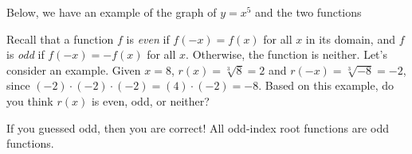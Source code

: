\documentclass{ximera}
\begin{document}
\begin{example}
Below, we have an example of the graph of $y=x^5$ and the two functions

\begin{image}
\end{image}

\end{example}

Recall that a function $f$ is {\em even} if $f(-x) = f(x)$ for all $x$ in its domain, and $f$ is {\em odd} if $f(-x) = -f(x)$ for all $x$. Otherwise, the function is neither. %
Let's consider an example. Given $x=8$, $r(x) = \sqrt[3]{8}=2$ and $r(-x) = \sqrt[3]{-8} = -2$, since $(-2)\cdot(-2)\cdot(-2) =(4)\cdot(-2) = -8$. Based on this example, do you think $r(x)$ is even, odd, or neither?

If you guessed odd, then you are correct! All odd-index root functions are odd functions. 
\end{document}
